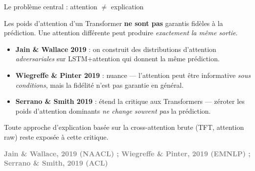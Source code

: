\documentclass[10pt]{beamer}
\newcommand{\source}[1]{\vspace{4pt}\hfill{\textcolor{gray}{\textbf{\tiny #1}}}}
\begin{document}
\begin{frame}{Le problème central : attention $\neq$ explication}
\vspace{-0.3cm}
  \begin{problembox}
    \centering Les poids d'attention d'un Transformer \textbf{ne sont pas} garantis fidèles à la prédiction.
    Une attention différente peut produire \emph{exactement la même sortie}.
  \end{problembox}

  \vspace{4pt}
  \begin{itemize}
    \item \textbf{Jain \& Wallace 2019} : on construit des distributions d'attention \emph{adversariales} sur LSTM+attention qui donnent la même prédiction.
    \item \textbf{Wiegreffe \& Pinter 2019} : nuance --- l'attention peut être informative \emph{sous conditions}, mais la fidélité n'est pas garantie en général.
    \item \textbf{Serrano \& Smith 2019} : étend la critique aux Transformers --- zéroter les poids d'attention dominants \emph{ne change souvent pas} la prédiction.
  \end{itemize}

  \begin{verdictbox}
    Toute approche d'explication basée sur la cross-attention brute (TFT, attention raw) reste exposée à cette critique.
  \end{verdictbox}
	\vspace{-0.4cm}
  \source{Jain \& Wallace, 2019 (NAACL) ; Wiegreffe \& Pinter, 2019 (EMNLP) ; Serrano \& Smith, 2019 (ACL)}
\end{frame}
\end{document}
